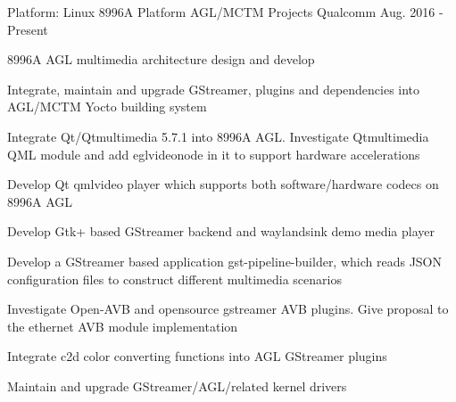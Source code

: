 

\begin{cventries}

  \cventry
    {Platform: Linux} %
    {8996A Platform AGL/MCTM Projects} %
    {Qualcomm} %
    {Aug. 2016 - Present} %
    {
      \begin{cvitems} %
        \item {8996A AGL multimedia architecture design and develop}
        \item {Integrate, maintain and upgrade GStreamer, plugins and dependencies into AGL/MCTM Yocto building system}
        \item {Integrate Qt/Qtmultimedia 5.7.1 into 8996A AGL. Investigate Qtmultimedia QML module and add eglvideonode in it to support hardware accelerations}
		\item {Develop Qt qmlvideo player which supports both software/hardware codecs on 8996A AGL}
		\item {Develop Gtk+ based GStreamer backend and waylandsink demo media player}
        \item {Develop a GStreamer based application gst-pipeline-builder, which reads JSON configuration files to  construct different multimedia scenarios}
        \item {Investigate Open-AVB and opensource gstreamer AVB plugins. Give proposal to the ethernet AVB module implementation}
		\item {Integrate c2d color converting functions into AGL GStreamer plugins}
		\item {Maintain and upgrade GStreamer/AGL/related kernel drivers}
      \end{cvitems}
    }


\end{cventries}
